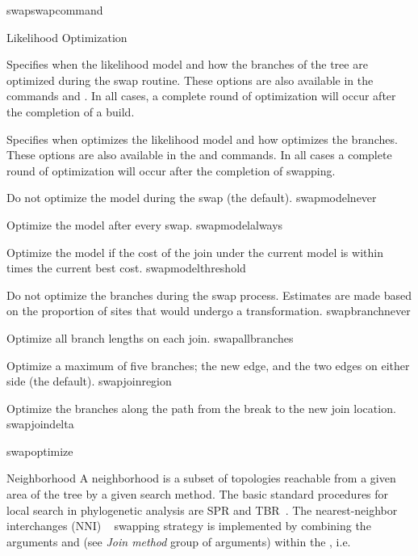 \begin{command}{swap}{swapcommand}
\begin{arguments}
\begin{argumentgroup}{Likelihood Optimization}
{Specifies when the likelihood model and how the branches of the
tree are optimized during the swap routine. These options are also
available in the commands  and .
In all cases, a complete round of optimization will occur
after the completion of a build.

{Specifies when \poy optimizes the likelihood model and how \poy optimizes
the branches. These options are also available in the
 and  commands. In all cases a
complete round of optimization will occur after the completion of swapping.

\begin{description}

{Do not optimize the model during the swap (the default).}
{swapmodelnever}

{Optimize the model after every swap.}
{swapmodelalways}

{Optimize the model if the cost of the join under the
current model is within  times the
current best cost.}
{swapmodelthreshold}

{Do not optimize the branches during the swap process.
Estimates are made based on the proportion of sites that
would undergo a transformation.}
{swapbranchnever}

{Optimize all branch lengths on each join.}
{swapallbranches}

{Optimize a maximum of five branches; the new edge, and the two
edges on either side (the default).}
{swapjoinregion}

{Optimize the branches along the path from the break to the
new join location.}
{swapjoindelta}

\end{description} 
} {swapoptimize}
}

\end{argumentgroup}

\begin{argumentgroup}{Neighborhood}
{A neighborhood is a subset of topologies reachable from a given 
area of the tree by a given search method. The basic standard procedures for 
local search in phylogenetic analysis are SPR and TBR~\cite{swofford1990}. 
The nearest-neighbor interchanges (NNI) ~\cite{camin1965} swapping strategy is implemented 
by combining the arguments  and 
(see \emph{Join method} group of arguments) within the , 
i.e. 
}
\label{swap_neigh}


\end{argumentgroup}
\end{arguments}
\end{command}
